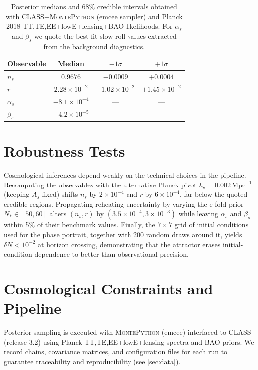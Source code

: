 \documentclass[11pt,a4paper]{article}
\begin{document}
\begin{table}[t]
    \centering
    \caption{Posterior medians and 68\% credible intervals obtained with \textsc{CLASS}+\textsc{MontePython} (emcee sampler) and Planck 2018 TT,TE,EE+lowE+lensing+BAO likelihoods. For $\alpha_{s}$ and $\beta_{s}$ we quote the best-fit slow-roll values extracted from the background diagnostics.}
    \begin{tabular}{lccc}
        \toprule
        Observable & Median & $-1\sigma$ & $+1\sigma$ \\
        \midrule
        $n_{s}$ & $0.9676$ & $-0.0009$ & $+0.0004$ \\
        $r$ & $2.28\times10^{-2}$ & $-1.02\times10^{-2}$ & $+1.45\times10^{-2}$ \\
        $\alpha_{s}$ & $-8.1\times10^{-4}$ & --- & --- \\
        $\beta_{s}$ & $-4.2\times10^{-5}$ & --- & --- \\
        \bottomrule
    \end{tabular}
    \label{tab:observables}
\end{table}

\section{Robustness Tests}
\label{sec:robustness}
Cosmological inferences depend weakly on the technical choices in the pipeline. Recomputing the observables with the alternative Planck pivot $k_{\star}=0.002\,\mathrm{Mpc}^{-1}$ (keeping $A_{s}$ fixed) shifts $n_{s}$ by $2\times10^{-4}$ and $r$ by $6\times10^{-4}$, far below the quoted credible regions. Propagating reheating uncertainty by varying the e-fold prior $N_{*}\in[50,60]$ alters $(n_{s},r)$ by $(3.5\times10^{-4},3\times10^{-3})$ while leaving $\alpha_{s}$ and $\beta_{s}$ within 5\% of their benchmark values. Finally, the $7\times7$ grid of initial conditions used for the phase portrait, together with 200 random draws around it, yields $\delta N<10^{-2}$ at horizon crossing, demonstrating that the attractor erases initial-condition dependence to better than observational precision.

\section{Cosmological Constraints and Pipeline}
\label{sec:constraints}
Posterior sampling is executed with \textsc{MontePython} (emcee) interfaced to \textsc{CLASS} (release 3.2) using Planck TT,TE,EE+lowE+lensing spectra and BAO priors. We record chains, covariance matrices, and configuration files for each run to guarantee traceability and reproducibility (see \cref{sec:data}).
\end{document}
